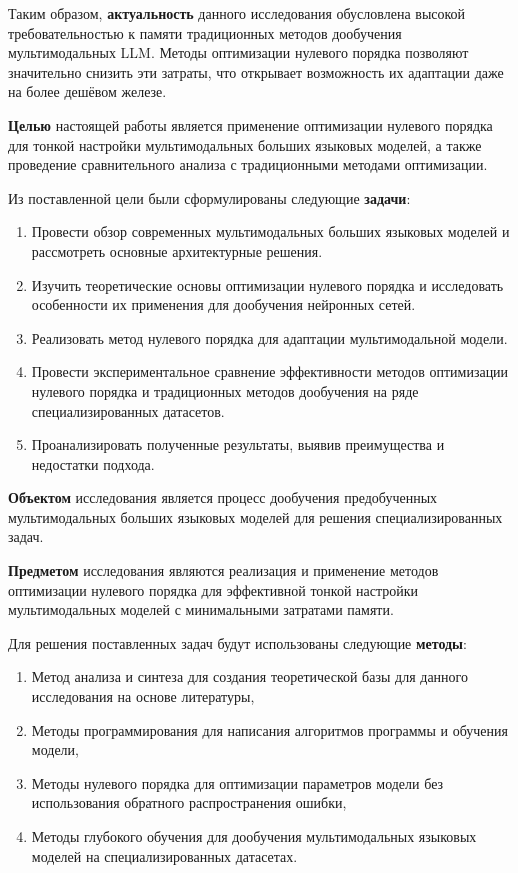 \documentclass[LI,KR]{HSEUniversity}
\begin{document}
Таким образом, \textbf{актуальность} данного исследования обусловлена высокой требовательностью к памяти традиционных методов дообучения мультимодальных LLM.
Методы оптимизации нулевого порядка позволяют значительно снизить эти затраты, что открывает возможность их адаптации даже на более дешёвом железе.


\textbf{Целью} настоящей работы является применение оптимизации нулевого порядка для тонкой настройки мультимодальных больших языковых моделей,
а также проведение сравнительного анализа с традиционными методами оптимизации.

Из поставленной цели были сформулированы следующие \textbf{задачи}:
\begin{enumerate}
    \item Провести обзор современных мультимодальных больших языковых моделей и рассмотреть основные архитектурные решения.
    \item Изучить теоретические основы оптимизации нулевого порядка и исследовать особенности их применения для дообучения нейронных сетей.
    \item Реализовать метод нулевого порядка для адаптации мультимодальной модели.
    \item Провести экспериментальное сравнение эффективности методов оптимизации нулевого порядка и традиционных методов дообучения на ряде специализированных датасетов.
    \item Проанализировать полученные результаты, выявив преимущества и недостатки подхода.
\end{enumerate}

\textbf{Объектом} исследования является процесс дообучения предобученных мультимодальных больших языковых моделей для решения специализированных задач.

\textbf{Предметом} исследования являются реализация и применение методов оптимизации нулевого порядка для эффективной тонкой настройки мультимодальных моделей с минимальными затратами памяти.

Для решения поставленных задач будут использованы следующие \textbf{методы}:
\begin{enumerate}
    \item  Метод анализа и синтеза для создания теоретической базы для данного исследования на основе литературы,
    \item  Методы программирования для написания алгоритмов программы и обучения модели,
    \item  Методы нулевого порядка для оптимизации параметров модели без использования обратного распространения ошибки,
    \item  Методы глубокого обучения для дообучения мультимодальных языковых моделей на специализированных датасетах.
\end{enumerate}
\end{document}

